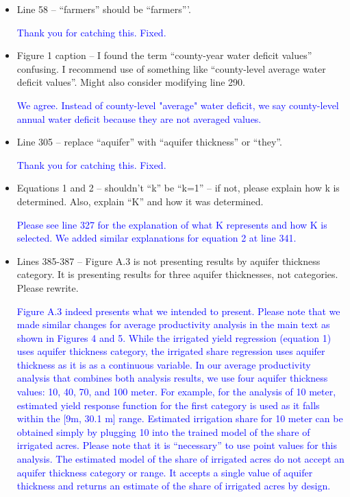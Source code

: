 \documentclass[
]{article}
\begin{document}
\begin{itemize}
    \item Line 58 – ``farmers'' should be ``farmers'''.

\textcolor{blue}{Thank you for catching this. Fixed.}

\item Figure 1 caption – I found the term ``county-year water deficit values'' confusing. I recommend use of something like ``county-level average water deficit values''. Might also consider modifying line 290.

\textcolor{blue}{We agree. Instead of county-level "average" water deficit, we say county-level annual water deficit because they are not averaged values.}

\item Line 305 – replace ``aquifer'' with ``aquifer thickness'' or ``they''.

\textcolor{blue}{Thank you for catching this. Fixed.}

\item Equations 1 and 2 – shouldn't ``k'' be ``k=1'' – if not, please explain how k is determined. Also, explain ``K'' and how it was determined.

\textcolor{blue}{Please see line 327 for the explanation of what K represents and how K is selected. We added similar explanations for equation 2 at line 341.}

\item Lines 385-387 – Figure A.3 is not presenting results by aquifer thickness category. It is presenting results for three aquifer thicknesses, not categories. Please rewrite.

\textcolor{blue}{Figure A.3 indeed presents what we intended to present. Please note that we made similar changes for average productivity analysis in the main text as shown in Figures 4 and 5. While the irrigated yield regression (equation 1) uses aquifer thickness category, the irrigated share regression uses aquifer thickness as it is as a continuous variable. In our average productivity analysis that combines both analysis results, we use four aquifer thickness values: 10, 40, 70, and 100 meter. For example, for the analysis of 10 meter, estimated yield response function for the first category is used as it falls within the [9m, 30.1 m] range. Estimated irrigation share for 10 meter can be obtained simply by plugging 10 into the trained model of the share of irrigated acres. Please note that it is ``necessary'' to use point values for this analysis. The estimated model of the share of irrigated acres do not accept an aquifer thickness category or range. It accepts a single value of aquifer thickness and returns an estimate of the share of irrigated acres by design.}


\end{itemize}
\end{document}

